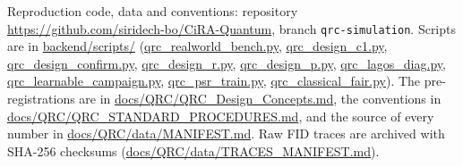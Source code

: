 \documentclass[aps,prresearch,preprint,superscriptaddress,amsmath,amssymb,floatfix]{revtex4-2}
\begin{document}
\begin{acknowledgments}
 Reproduction code, data and
conventions: repository \url{https://github.com/siridech-bo/CiRA-Quantum}, branch
\texttt{qrc-simulation}. Scripts are in \url{backend/scripts/} (\url{qrc_realworld_bench.py},
\url{qrc_design_c1.py}, \url{qrc_design_confirm.py}, \url{qrc_design_r.py},
\url{qrc_design_p.py}, \url{qrc_lagos_diag.py}, \url{qrc_learnable_campaign.py}, \url{qrc_psr_train.py},
\url{qrc_classical_fair.py}). The pre-registrations are in
\url{docs/QRC/QRC_Design_Concepts.md}, the conventions in
\url{docs/QRC/QRC_STANDARD_PROCEDURES.md}, and the source of every number in
\url{docs/QRC/data/MANIFEST.md}. Raw FID traces are archived with SHA-256 checksums
(\url{docs/QRC/data/TRACES_MANIFEST.md}).
\end{acknowledgments}
\end{document}
